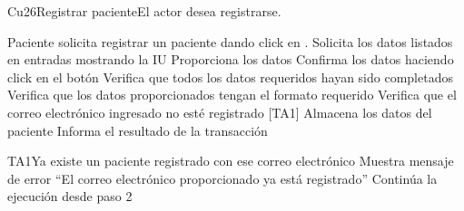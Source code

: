 \begin{UseCase}{Cu26}{Registrar paciente}{El actor desea registrarse.}
	
\end{UseCase}

\begin{UCtrayectoria}{Paciente}
		\UCpaso[\UCactor] solicita registrar un paciente dando click en .
		\UCpaso Solicita los datos listados en entradas mostrando la IU
		\UCpaso [\UCactor] Proporciona los datos
		\UCpaso [\UCactor] Confirma los datos haciendo click en el botón 
		\UCpaso Verifica que todos los datos requeridos hayan sido completados
		\UCpaso Verifica que los datos proporcionados tengan el formato requerido
		\UCpaso Verifica que el correo electrónico ingresado no esté registrado [TA1]
		\UCpaso Almacena los datos del paciente 
		\UCpaso Informa el resultado de la transacción
\end{UCtrayectoria}

\begin{UCtrayectoriaA}{TA1}{Ya existe un paciente registrado con ese correo electrónico}
	\UCpaso Muestra mensaje de error ``El correo electrónico proporcionado ya está registrado''
	\UCpaso Continúa la ejecución desde paso 2
	
\end{UCtrayectoriaA}

